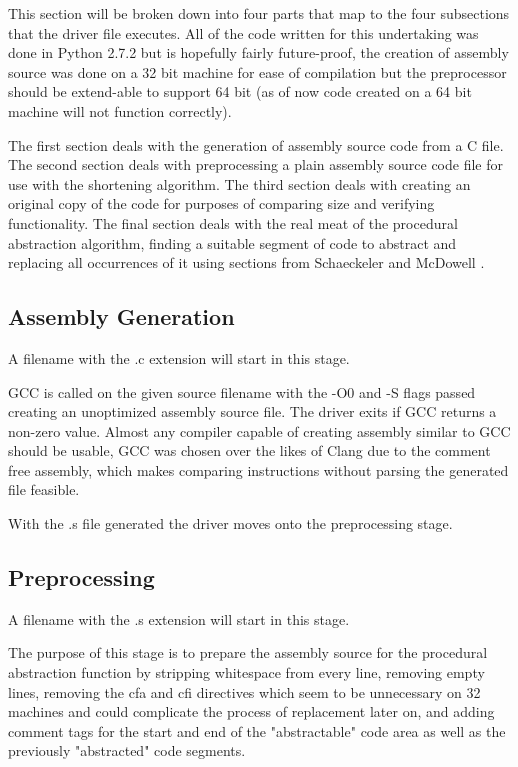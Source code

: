 \documentclass[9pt,nocopyrightspace]{sigplanconf}
\begin{document}
This section will be broken down into four parts that map to the four subsections that the driver file executes.
All of the code written for this undertaking was done in Python 2.7.2 but is hopefully fairly future-proof, the creation of assembly source was done on a 32 bit machine for ease of compilation but the preprocessor should be extend-able to support 64 bit (as of now code created on a 64 bit machine will not function correctly).

The first section deals with the generation of assembly source code from a C file.
The second section deals with preprocessing a plain assembly source code file for use with the shortening algorithm.
The third section deals with creating an original copy of the code for purposes of comparing size and verifying functionality.
The final section deals with the real meat of the procedural abstraction algorithm, finding a suitable segment of code to abstract  and replacing all occurrences of it using sections from  Schaeckeler \cite{theory01} and McDowell \cite{ctci01}.

\subsection{Assembly Generation}

A filename with the .c extension will start in this stage.

GCC is called on the given source filename with the -O0 and -S flags passed creating an unoptimized assembly source file.
The driver exits if GCC returns a non-zero value.
Almost any compiler capable of creating assembly similar to GCC should be usable, GCC was chosen over the likes of Clang due to the comment free assembly, which makes comparing instructions without parsing the generated file feasible.

With the .s file generated the driver moves onto the preprocessing stage.

\subsection{Preprocessing}

A filename with the .s extension will start in this stage.

The purpose of this stage is to prepare the assembly source for the procedural abstraction function by stripping whitespace from every line, removing empty lines, removing the cfa and cfi directives which seem to be unnecessary on 32 machines and could complicate the process of replacement later on, and adding comment tags for the start and end of the "abstractable" code area as well as the previously "abstracted" code segments.
\end{document}
